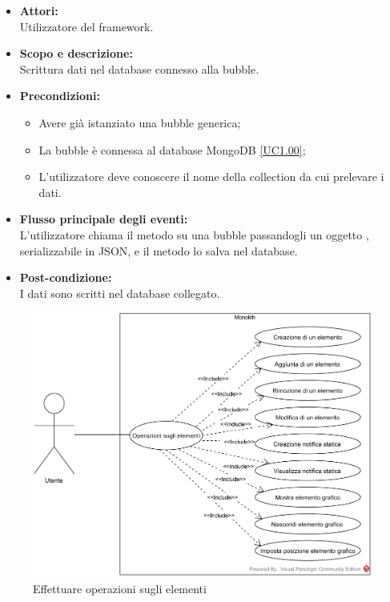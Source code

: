 \begin{itemize}
\item \textbf{Attori:}
\\Utilizzatore del framework.
\item \textbf{Scopo e descrizione:} 
\\Scrittura dati nel database connesso alla bubble.
\item \textbf{Precondizioni:}
\begin{itemize}
	\item Avere già istanziato una bubble generica;
	\item La bubble è connessa al database MongoDB \ref{UC1.00};
	\item L'utilizzatore deve conoscere il nome della collection da cui prelevare i dati.
\end{itemize}
\item \textbf{Flusso principale degli eventi:}
\\L'utilizzatore chiama il metodo su una bubble passandogli un oggetto , serializzabile in JSON, e il metodo lo salva nel database.
\item \textbf{Post-condizione:}
\\I dati sono scritti nel database collegato.
\end{itemize}


\begin{figure}[H]
	\centering
	\includegraphics[width=15cm]{../../documenti/AnalisiDeiRequisiti/Diagrammi_img/operazioni.png}
	\caption{\UCCaption{} Effettuare operazioni sugli elementi}
\end{figure}

